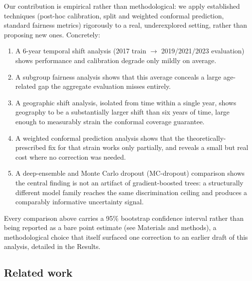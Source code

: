 \documentclass[12pt]{article}
\begin{document}
Our contribution is empirical rather than methodological: we apply established techniques (post-hoc calibration, split and weighted conformal prediction, standard fairness metrics) rigorously to a real, underexplored setting, rather than proposing new ones. Concretely:

\begin{enumerate}[leftmargin=*]
\item A 6-year temporal shift analysis (2017 train $\to$ 2019/2021/2023 evaluation) shows performance and calibration degrade only mildly on average.
\item A subgroup fairness analysis shows that this average conceals a large age-related gap the aggregate evaluation misses entirely.
\item A geographic shift analysis, isolated from time within a single year, shows geography to be a substantially larger shift than six years of time, large enough to measurably strain the conformal coverage guarantee.
\item A weighted conformal prediction analysis shows that the theoretically-prescribed fix for that strain works only partially, and reveals a small but real cost where no correction was needed.
\item A deep-ensemble and Monte Carlo dropout (MC-dropout) comparison shows the central finding is not an artifact of gradient-boosted trees: a structurally different model family reaches the same discrimination ceiling and produces a comparably informative uncertainty signal.
\end{enumerate}

Every comparison above carries a 95\% bootstrap confidence interval rather than being reported as a bare point estimate (see Materials and methods), a methodological choice that itself surfaced one correction to an earlier draft of this analysis, detailed in the Results.

\subsection{Related work}
\end{document}
